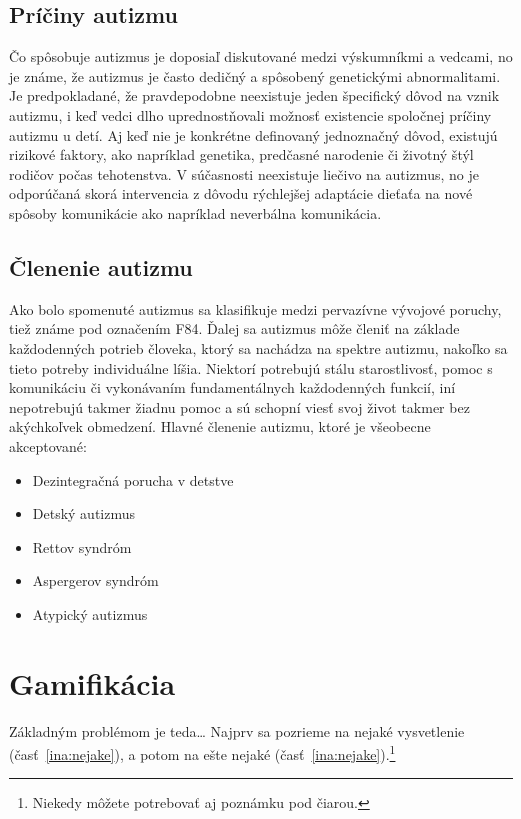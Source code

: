 \documentclass[10pt,twoside,slovak,a4paper]{coursepaper}
\begin{document}
\subsection{Príčiny autizmu}
	Čo spôsobuje autizmus je doposiaľ diskutované medzi výskumníkmi a vedcami, no je známe, že autizmus je často dedičný a spôsobený genetickými abnormalitami. Je predpokladané, že pravdepodobne neexistuje jeden špecifický dôvod na vznik autizmu, i keď vedci dlho uprednostňovali možnosť existencie spoločnej príčiny autizmu u detí. Aj keď nie je konkrétne definovaný jednoznačný dôvod, existujú rizikové faktory, ako napríklad genetika, predčasné narodenie či životný štýl rodičov počas tehotenstva. V súčasnosti neexistuje liečivo na autizmus, no je odporúčaná skorá intervencia z dôvodu rýchlejšej adaptácie dieťaťa na nové spôsoby komunikácie ako napríklad neverbálna komunikácia. 


\subsection{Členenie autizmu}
Ako bolo spomenuté autizmus sa klasifikuje medzi pervazívne vývojové poruchy, tiež známe pod označením F84. Ďalej sa autizmus môže členiť na základe každodenných potrieb človeka, ktorý sa nachádza na spektre autizmu, nakoľko sa tieto potreby individuálne líšia. Niektorí potrebujú stálu starostlivosť, pomoc s komunikáciu či vykonávaním fundamentálnych každodenných funkcií, iní nepotrebujú takmer žiadnu pomoc a sú schopní viesť svoj život takmer bez akýchkoľvek obmedzení. Hlavné členenie autizmu, ktoré je všeobecne akceptované:  

\begin{itemize}
\item Dezintegračná porucha v detstve
\item Detský autizmus
\item Rettov syndróm
\item Aspergerov syndróm 
\item Atypický autizmus
\end{itemize}


\section{Gamifikácia}

Základným problémom je teda\ldots{} Najprv sa pozrieme na nejaké vysvetlenie (časť~\ref{ina:nejake}), a potom na ešte nejaké (časť~\ref{ina:nejake}).\footnote{Niekedy môžete potrebovať aj poznámku pod čiarou.}
\end{document}
